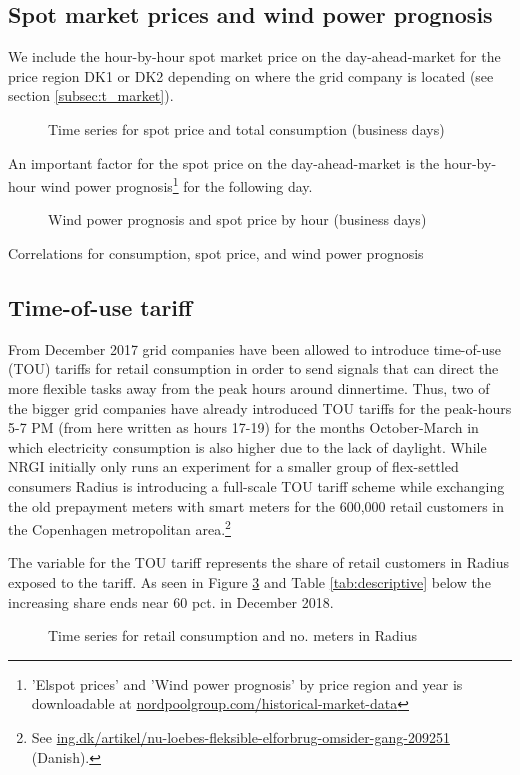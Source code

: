 \subsection{Spot market prices and wind power prognosis}
\label{subsec:d_spot}
We include the hour-by-hour spot market price on the day-ahead-market for the price region DK1 or DK2 depending on where the grid company is located (see section \ref{subsec:t_market}).
\begin{figure}[H]
  \centering
  \caption{Time series for spot price and total consumption (business days)}
  \label{fig:price_cons_time_series}
\end{figure}
An important factor for the spot price on the day-ahead-market is the hour-by-hour wind power prognosis\footnote{'Elspot prices' and 'Wind power prognosis' by price region and year is downloadable at \href{https://www.nordpoolgroup.com/historical-market-data/}{nordpoolgroup.com/historical-market-data}} for the following day.
\begin{figure}[H]
  \centering
  \caption{Wind power prognosis and spot price by hour (business days)}
  \label{fig:wp_price_hour}
\end{figure}


\begin{table}[H]
  \centering
  \caption{Correlations for consumption, spot price, and wind power prognosis}
  \footnotesize
  \label{tab:correlations}
\end{table}


\subsection{Time-of-use tariff}
\label{subsec:d_tout}
From December 2017 grid companies have been allowed to introduce time-of-use (TOU) tariffs for retail consumption in order to send signals that can direct the more flexible tasks away from the peak hours around dinnertime. Thus, two of the bigger grid companies have already introduced TOU tariffs for the peak-hours 5-7 PM (from here written as hours 17-19) for the months October-March in which electricity consumption is also higher due to the lack of daylight. While NRGI initially only runs an experiment for a smaller group of flex-settled consumers Radius is introducing a full-scale TOU tariff scheme while exchanging the old prepayment meters with smart meters for the 600,000 retail customers in the Copenhagen metropolitan area.\footnote{See \href{https://ing.dk/artikel/nu-loebes-fleksible-elforbrug-omsider-gang-209251}{ing.dk/artikel/nu-loebes-fleksible-elforbrug-omsider-gang-209251} (Danish).}
\par
The variable for the TOU tariff represents the share of retail customers in Radius exposed to the tariff. As seen in Figure \ref{fig:cons_meters_time_series} and Table \ref{tab:descriptive} below the increasing share ends near 60 pct. in December 2018.
\begin{figure}[H]
  \centering
  \caption{Time series for retail consumption and no. meters in Radius}
  \label{fig:cons_meters_time_series}
\end{figure}


